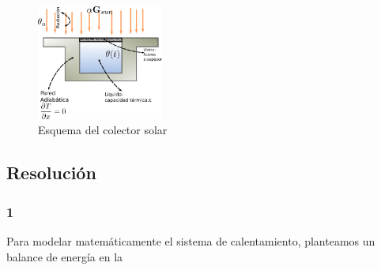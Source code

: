 \documentclass[10pt]{article}
\begin{document}
\begin{figure}[H]
   \centering
   \includegraphics[width=0.37\textwidth]{Images/colector_esquema.eps}
   \caption{Esquema del colector solar}\label{fig:colector_esquema}
\end{figure}
\subsection{Resolución}
\subsubsection{1}
Para modelar matemáticamente el sistema de calentamiento, planteamos un balance de energía en la 

\end{document}
